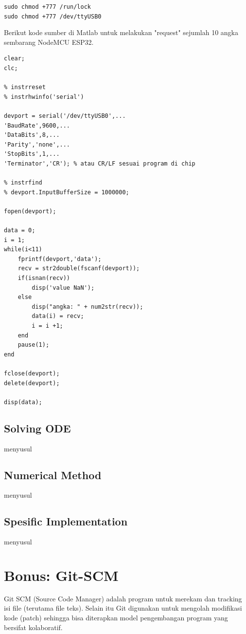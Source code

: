 \documentclass[12pt]{book}
\begin{document}
	\begin{verbatim}
sudo chmod +777 /run/lock
sudo chmod +777 /dev/ttyUSB0
	\end{verbatim}

	Berikut kode sumber di Matlab untuk melakukan "request" sejumlah 10 angka sembarang NodeMCU ESP32.

	\begin{verbatim}
clear;
clc;

% instrreset
% instrhwinfo('serial')

devport = serial('/dev/ttyUSB0',...
'BaudRate',9600,...
'DataBits',8,...
'Parity','none',...
'StopBits',1,...
'Terminator','CR'); % atau CR/LF sesuai program di chip

% instrfind
% devport.InputBufferSize = 1000000;

fopen(devport);

data = 0;
i = 1;
while(i<11)
	fprintf(devport,'data');
	recv = str2double(fscanf(devport));
	if(isnan(recv))
		disp('value NaN');
	else
		disp("angka: " + num2str(recv));
		data(i) = recv;
		i = i +1;
	end
	pause(1);
end

fclose(devport);
delete(devport);

disp(data);
	\end{verbatim}

	\newpage
	\section{Solving ODE}
	
	menyusul
	
	\section{Numerical Method}
	
	menyusul
	
	\section{Spesific Implementation}
	
	menyusul
	
	\chapter{Bonus: Git-SCM}
	
	Git SCM (Source Code Manager) adalah program untuk merekam dan tracking isi file (terutama file teks).
	Selain itu Git digunakan untuk mengolah modifikasi kode (patch) sehingga bisa diterapkan
	model pengembangan program yang bersifat kolaboratif.\\
	
\end{document}
